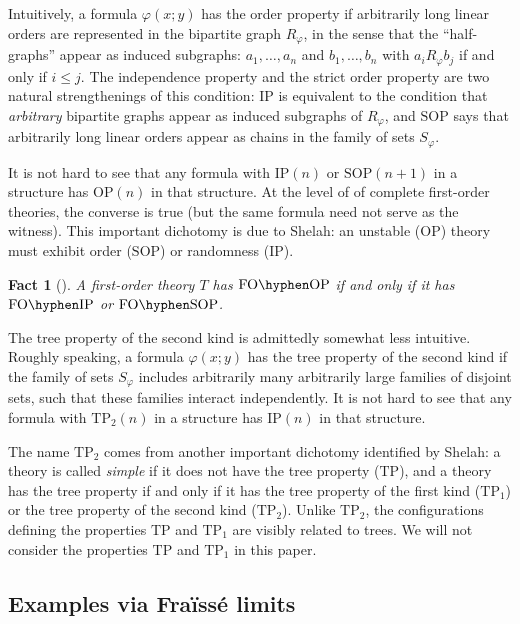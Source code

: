 \documentclass{lmcs}
\newcommand{\FO}{\mathrm{FO}}
\newcommand{\FOP}[1]{\FO\hyphen#1}
\newcommand{\OP}{\mathrm{OP}}
\newcommand{\IP}{\mathrm{IP}}
\newcommand{\SOP}{\mathrm{SOP}}
\newcommand{\TP}{\mathrm{TP}}
\newcommand{\TPO}{\mathrm{TP}_1}
\newcommand{\TPT}{\mathrm{TP}_2}
\newcommand{\Fraisse}{Fra\"iss\'e\xspace}
\theoremstyle{thmC}
\newtheorem{factC}[thm]{Fact}
\begin{document}
Intuitively, a formula $\varphi(x;y)$ has the order property if arbitrarily long linear orders are represented in the bipartite graph $R_\varphi$, in the sense that the ``half-graphs'' appear as induced subgraphs: $a_1,\dots,a_n$ and $b_1,\dots,b_n$ with $a_i R_\varphi b_j$ if and only if $i\leq j$. The independence property and the strict order property are two natural strengthenings of this condition: $\IP$ is equivalent to the condition that \emph{arbitrary} bipartite graphs appear as induced subgraphs of $R_\varphi$, and $\SOP$ says that arbitrarily long linear orders appear as chains in the family of sets $S_\varphi$. 

It is not hard to see that any formula with $\IP(n)$ or $\SOP(n+1)$ in a structure has $\OP(n)$ in that structure. At the level of of complete first-order theories, the converse is true (but the same formula need not serve as the witness). This important dichotomy is due to Shelah: an unstable ($\OP$) theory must exhibit order ($\SOP$) or randomness ($\IP$). 

\begin{factC}[{\cite[Theorem II.4.7]{S}}]\label{fact:dichotomy}
A first-order theory $T$ has $\FOP{\OP}$ if and only if it has $\FOP{\IP}$ or $\FOP{\SOP}$.
\end{factC}

The tree property of the second kind is admittedly somewhat less intuitive. Roughly speaking, a formula $\varphi(x;y)$ has the tree property of the second kind if the family of sets $S_\varphi$ includes arbitrarily many arbitrarily large families of disjoint sets, such that these families interact independently. It is not hard to see that any formula with $\TPT(n)$ in a structure has $\IP(n)$ in that structure.

The name $\TPT$ comes from another important dichotomy identified by Shelah: a theory is called \emph{simple} if it does not have the tree property ($\TP$), and a theory has the tree property if and only if it has the tree property of the first kind ($\TPO$) or the tree property of the second kind ($\TPT$). Unlike $\TPT$, the configurations defining the properties $\TP$ and $\TPO$ are visibly related to trees. We will not consider the properties $\TP$ and $\TPO$ in this paper.


\subsection{Examples via \Fraisse limits}
\end{document}
